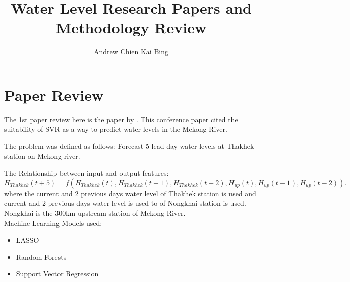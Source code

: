 \documentclass[]{article}
\title{Water Level Research Papers and Methodology Review}
\author{Andrew Chien Kai Bing}
\begin{document}
\maketitle

\section{Paper Review}
	The 1st paper review here is the paper by \cite{Nguyen2015Oct}. This conference paper cited the suitability of SVR as a way to predict water levels in the Mekong River.
	
	The problem was defined as follows:
	Forecast 5-lead-day water levels at Thakhek station on Mekong river.
	
	The Relationship between input and output features:\\

		\(H_{Thakhek}(t + 5) = f(H_{Thakhek}(t),H_{Thakhek}(t − 1),H_{Thakhek}(t − 2),H_{up}(t),H_{up}(t − 1),H_{up}(t − 2)).\)\\	
	
	where the current and 2 previous days water level of Thakhek station is used and current and 2 previous days water level is used to of Nongkhai station is used. Nongkhai is the 300km upstream station of Mekong River.\\
	
	Machine Learning Models used:
	\begin{itemize}
		\item LASSO
		\item Random Forests
		\item Support Vector Regression
	\end{itemize}


	
	
\end{document}
